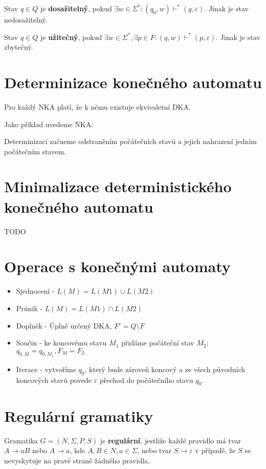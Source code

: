 \documentclass{szzclass}
\begin{document}
Stav $q\in Q$ je \textbf{dosažitelný}, pokud $\exists w\in\Sigma^{*}: (q_0,w)\vdash^{*}(q,\varepsilon)$. Jinak je stav nedosažitelný.

Stav $q\in Q$ je \textbf{užitečný}, pokud $\exists w\in\Sigma^{*},\exists p\in F: (q,w)\vdash^{*}(p,\varepsilon)$. Jinak je stav zbytečný.

\section{Determinizace konečného automatu}

Pro každý NKA platí, že k němu existuje ekvivaletní DKA.

Jako příklad uvedeme NKA:

Determinizaci začneme odstraněním počátečních stavů a jejich nahrazení jedním počátečním stavem.

\section{Minimalizace deterministického konečného automatu}
TODO

\section{Operace s konečnými automaty}
\begin{itemize}
\item Sjednocení - $L(M) = L(M1) \cup L(M2)$
\item Průnik - $L(M) = L(M1) \cap L(M2)$
\item Doplněk - Úplně určený DKA, $F'=Q\setminus F$
\item Součin - ke koncovému stavu $M_1$ přidáme počáteční stav $M_2$; $q_{0,M}=q_{0,M_1}, F_M=F_2$
\item Iterace - vytvoříme $q_0$, který bude zároveň koncový a ze všech původních koncových stavů povede $\varepsilon$ přechod do počátečního stavu $q_0$.
\end{itemize}

\section{Regulární gramatiky}
Gramatika $G=(N,\Sigma,P,S)$ je \textbf{regulární}, jestliže každé pravidlo má tvar $A \to aB$ nebo $A \to a$, kde $A, B \in N, a \in \Sigma$, nebo tvar $S \to \varepsilon$ v případě, že $S$ se nevyskytuje na pravé straně žádného pravidla.
\end{document}
